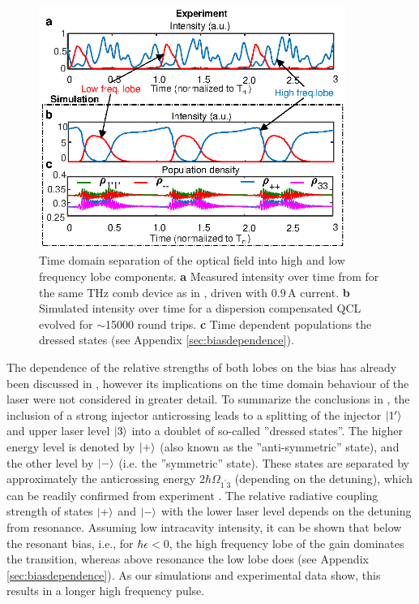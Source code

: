 \documentclass[10pt,letterpaper]{article}%
\begin{document}
\begin{figure}[h!]
	\begin{center}
		\includegraphics[width=10cm]{figs/TEMPHOLEBURNING_EXPERIMENT.eps}
	\end{center}
	\caption{Time domain separation of the optical field into high and low
		frequency lobe components. \textbf{a} Measured intensity over time from
		\cite{burghoff2015evaluating} for the same THz comb device as in
		\cite{burghoff2014terahertz}, driven with $0.9{\,}\mathrm{A}$ current.
		\textbf{b} Simulated intensity over time for a dispersion compensated QCL
		evolved for $\sim$15000 round trips. \textbf{c} Time dependent populations the
		dressed states (see Appendix \ref{sec:biasdependence}).}%
	\label{fig:img06}%
\end{figure}

The dependence of the relative strengths of both lobes on the bias\textrm{
}has already been discussed in \cite{dupont2010simplified}, however its
implications on the time domain behaviour of the laser were not considered in
greater detail. To summarize the conclusions in \cite{dupont2010simplified},
the inclusion of a strong injector anticrossing leads to a splitting of the
injector $\Ket{1'}$ and upper laser level $\Ket{3}$ into a doublet of
so-called ''dressed states''. The higher energy level is denoted by $\Ket{+}$
(also known as the ''anti-symmetric'' state), and the other level by $\Ket{-}$
(i.e. the ''symmetric'' state). These states are separated by approximately
the anticrossing energy $2\hbar\Omega_{1^{\prime}3}$ (depending on the
detuning), which can be readily confirmed from experiment
\cite{burghoff2014terahertz}. The relative radiative coupling strength of
states $\Ket{+}$ and $\Ket{-}$ with the lower laser level depends on the
detuning from resonance. Assuming low intracavity intensity, it can be shown
that below the resonant bias, i.e., for $\hbar\epsilon<0$, the high frequency
lobe of the gain dominates the transition, whereas above resonance the low
lobe does (see Appendix \ref{sec:biasdependence}). As our simulations and
experimental data show, this results in a longer high frequency pulse.
\end{document}
